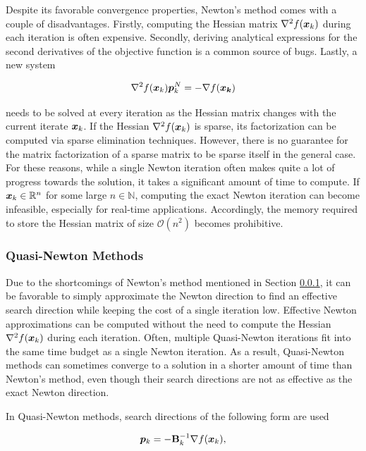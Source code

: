 Despite its favorable convergence properties, Newton's method comes with a couple of disadvantages. Firstly, computing the Hessian matrix
$\nabla^2 f(\bm{x}_k)$ during each iteration is often expensive. Secondly, deriving analytical expressions for the second derivatives of 
the objective function is a common source of bugs. Lastly, a new system 

\[
    \nabla^2 f(\bm{x}_k) \bm{p}^N_k = - \nabla f(\bm{x_k})
\]

\noindent needs to be solved at every iteration as the Hessian matrix changes with the current iterate $\bm{x}_k$.
If the Hessian $\nabla^2 f(\bm{x}_k)$ is sparse, its factorization can be computed via sparse elimination techniques. However, there is no
guarantee for the matrix factorization of a sparse matrix to be sparse itself in the general case.
For these reasons, while a single
Newton iteration often makes quite a lot of progress towards the solution, it takes a significant amount of time to compute. If $\bm{x}_k
\in \mathbb{R}^n$ for some large $n \in \mathbb{N}$, computing the exact Newton iteration can become infeasible, especially for real-time
applications. Accordingly, the memory required to store the Hessian matrix of size $\mathcal{O}(n^2)$ becomes prohibitive.

\subsubsection{Quasi-Newton Methods}\label{sss:quasi-newton}
Due to the shortcomings of Newton's method mentioned in Section \ref{sss:quasi-newton}, it can be favorable to simply approximate the Newton 
direction
to find an effective search direction while keeping the cost of a single iteration low. Effective Newton approximations can be 
computed without the need to compute the Hessian $\nabla^2 f(\bm{x}_k)$ during each iteration. Often, multiple Quasi-Newton 
iterations fit into the same time budget as a single Newton iteration. As a result, Quasi-Newton methods can sometimes converge to a 
solution in a shorter amount of time than Newton's method, even though their search directions are not as effective as the exact 
Newton direction.

In Quasi-Newton methods, search directions of the following form are used

\begin{equation}\label{eq:quasi-newton-direction}
    \bm{p}_k = -\mathbf{B}^{-1}_k \nabla f(\bm{x}_k),
\end{equation}

